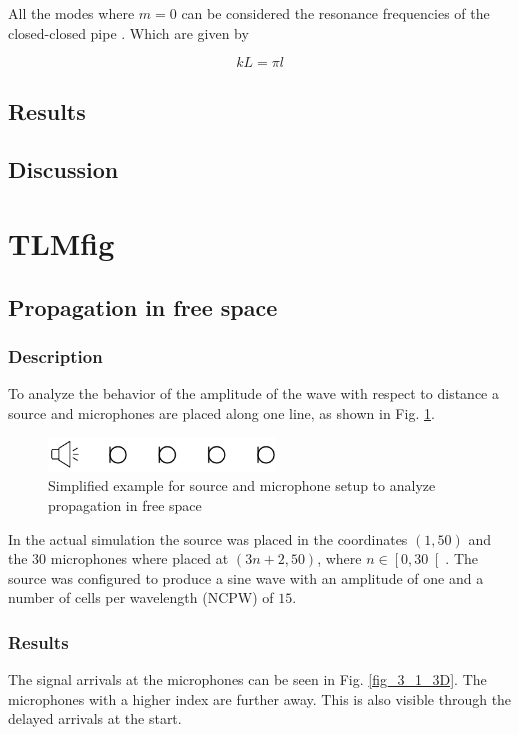 \documentclass[twocolumn]{article}
\begin{document}
All the modes where $m=0$ can be considered the resonance frequencies of the closed-closed
pipe \cite{PipesResonators}.
Which are given by

\begin{equation}
    kL = \pi l
\end{equation}

\subsection{Results}

\subsection{Discussion}

\section{TLMfig}
\subsection{Propagation in free space}
\subsubsection{Description}
To analyze the behavior of the amplitude of the wave with respect to distance a source and
microphones are placed along one line, as shown in Fig. \ref{fig_3_1_example}.

\begin{figure}[H]
    \centering
    \includegraphics[width=60mm]{./Images/tlmfig_3_1.png}
    \caption{Simplified example for source and microphone setup to analyze propagation in free space}
    \label{fig_3_1_example}
\end{figure}

In the actual simulation the source was placed in the coordinates $\left(1,50\right)$ and
the 30 microphones where placed at $\left(3n+2,50\right)$, where $n\in\left[0,30\right[$.
The source was configured to produce a sine wave with an amplitude of one and a
number of cells per wavelength (NCPW) of $15$.

\subsubsection{Results}
The signal arrivals at the microphones can be seen in Fig. \ref{fig_3_1_3D}.
The microphones with a higher index are further away.
This is also visible through the delayed arrivals at the start.
\end{document}
